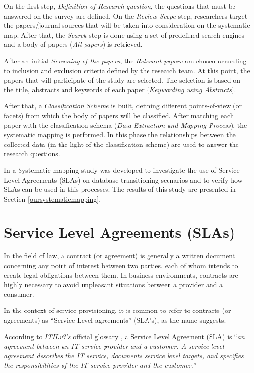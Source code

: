 On the first step, \textit{Definition of Research question}, the questions that must be answered on the survey are defined. 
On the \textit{Review Scope} step, researchers target the papers/journal sources that will be taken into consideration on the systematic map. 
After that, the \textit{Search} step is done using a set of predefined search engines and a body of papers (\textit{All papers}) is retrieved. 

After an initial \textit{Screening of the papers}, the \textit{Relevant papers} are chosen according to inclusion and exclusion criteria defined by the research team. 
At this point, the papers that will participate of the study are selected. 
The selection is based on the title, abstracts and keywords of each paper (\textit{Keywording using Abstracts}).

After that, a \textit{Classification Scheme} is built, defining different points-of-view (or facets) from which the body of papers will be classified. 
After matching each paper with the classification schema (\textit{Data Extraction and Mapping Process}), the  systematic mapping is performed.
In this phase the relationships between the collected data (in the light of the classification scheme) are used to answer the research questions.

In \cite{fabioMartinSM} a Systematic mapping study was developed to investigate the use of Service-Level-Agreements (SLAs) on database-transitioning scenarios and to verify how SLAs can be used in this processes. The results of this study are presented in Section \ref{oursystematicmapping}.

\section{Service Level Agreements (SLAs)}

In the field of law, a contract (or agreement) is generally a written document concerning any point of interest between two parties, each of whom intends to create legal obligations between them. In business environments, contracts are highly necessary to avoid unpleasant situations between a provider and a consumer. 

In the context of service provisioning, it is common to refer to contracts (or agreements) as ``Service-Level agreements'' (SLA's), as the name suggests.  

According to \textit{ITILv3's} official glossary \cite{itilv3glossary}, a Service Level Agreement (SLA) is ``\textit{an agreement between an IT service provider and a customer. 
A service level agreement describes the IT service, documents service level targets, and specifies the responsibilities of the IT service provider and the customer.}'' 

